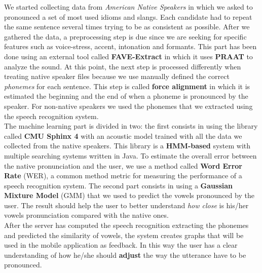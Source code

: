\noindent We started collecting data from \textit{American Native Speakers} in which we asked to pronounced a set of most used idioms and slangs. Each candidate had to repeat the same sentence several times trying to be as consistent as possible. After we gathered the data, a preprocessing step is due since we are seeking for specific features such as voice-stress, accent, intonation and formants. 
This part has been done using an external tool called \textbf{FAVE-Extract} in which it uses \textbf{PRAAT}\cite{boersma2010p} to analyze the sound. At this point, the next step is processed differently when treating native speaker files because we use manually defined the correct \textit{phonemes} for each sentence. This step is called \textbf{force alignment} in which it is estimated the beginning and the end of when a phoneme is pronounced by the speaker. For non-native speakers we used the phonemes that we extracted using the speech recognition system. \\

\noindent The machine learning part is divided in two: the first consists in using the library called \textbf{CMU Sphinx 4} with an acoustic model trained with all the data we collected from the native speakers. This library is a \textbf{HMM-based} system with multiple searching systems written in Java. To estimate the overall error between the native pronunciation and the user, we use a method called \textbf{Word Error Rate} (WER), a common method metric for measuring the performance of a speech recognition system. 
The second part consists in using a \textbf{Gaussian Mixture Model} (GMM) that we used to predict the vowels pronounced by the user. The result should help the user to better understand \textit{how close} is his/her vowels pronunciation compared with the native ones. \\

\noindent After the server has computed the speech recognition extracting the phonemes and predicted the similarity of vowels, the system creates graphs that will be used in the mobile application as feedback. In this way the user has a clear understanding of how he/she should \textbf{adjust} the way the utterance have to be pronounced. \\